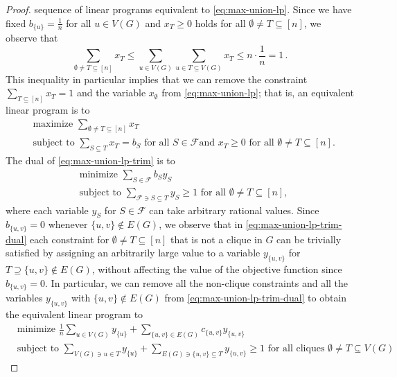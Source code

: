 \documentclass[11pt]{article}
\begin{document}
\begin{proof}
sequence of linear programs equivalent to \eqref{eq:max-union-lp}. 
Since we have 
fixed $b_{\{u\}}=\frac{1}{n}$ for all $u\in V(G)$ and $x_T\geq 0$ holds 
for all $\emptyset\neq T\subseteq[n]$, we observe that 
\[
\sum_{\emptyset\neq T\subseteq[n]}x_T\leq \sum_{u\in V(G)}\sum_{u\in T\subseteq V(G)}x_T\leq n\cdot\frac{1}{n}=1\,. 
\]
This inequality in particular implies that we can remove the constraint
$\sum_{T\subseteq[n]}x_T=1$ and the variable $x_\emptyset$ 
from \eqref{eq:max-union-lp}; that is, an equivalent linear program is to
\begin{equation}
\label{eq:max-union-lp-trim}
\begin{split}
&\text{maximize $\sum_{\emptyset\neq T\subseteq[n]}x_T$}\\
&\text{subject to $\sum_{S\subseteq T}x_T=b_S$ for all $S\in\mathcal{F}$
and $x_T\geq 0$ for all $\emptyset\neq T\subseteq[n]$}.
\end{split}
\end{equation}
The dual of \eqref{eq:max-union-lp-trim} is to
\begin{equation}
\label{eq:max-union-lp-trim-dual}
\begin{split}
&\text{minimize $\sum_{S\in\mathcal{F}}b_Sy_S$}\\
&\text{subject to $\sum_{\mathcal{F}\ni S\subseteq T}y_S\geq 1$ for all $\emptyset\neq T\subseteq[n]$},
\end{split}
\end{equation}
where each variable $y_S$ for $S\in\mathcal{F}$ can take arbitrary rational
values. Since $b_{\{u,v\}}=0$ whenever $\{u,v\}\notin E(G)$, we observe
that in \eqref{eq:max-union-lp-trim-dual} each constraint for 
$\emptyset\neq T\subseteq[n]$ that is not a clique in $G$ can be 
trivially satisfied by assigning an arbitrarily large value to a 
variable $y_{\{u,v\}}$ for $T\supseteq\{u,v\}\notin E(G)$, 
without affecting the value of the objective function since $b_{\{u,v\}}=0$.
In particular, we can remove all the non-clique constraints and all the
variables $y_{\{u,v\}}$ with $\{u,v\}\notin E(G)$ 
from \eqref{eq:max-union-lp-trim-dual} to obtain the equivalent linear 
program to 
\begin{equation}
\label{eq:max-union-lp-trim-dual-clique}
\begin{split}
&\text{minimize $\frac{1}{n}\sum_{u\in V(G)}y_{\{u\}}+\sum_{\{u,v\}\in E(G)}c_{\{u,v\}}y_{\{u,v\}}$}\\
&\text{subject to $\sum_{V(G)\ni u\in T}y_{\{u\}}+\sum_{E(G)\ni \{u,v\}\subseteq T}y_{\{u,v\}}\geq 1$ for all cliques $\emptyset\neq T\subseteq V(G)$}.

\end{split}
\end{equation}
\end{proof}
\end{document}
